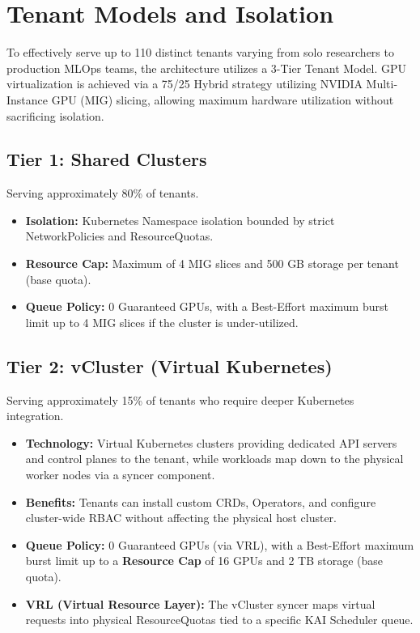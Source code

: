 \chapter{Tenant Models and Isolation}

To effectively serve up to 110 distinct tenants varying from solo researchers to production MLOps teams, the architecture utilizes a 3-Tier Tenant Model. GPU virtualization is achieved via a 75/25 Hybrid strategy utilizing NVIDIA Multi-Instance GPU (MIG) slicing, allowing maximum hardware utilization without sacrificing isolation.

\section{Tier 1: Shared Clusters}
Serving approximately 80\% of tenants.
\begin{itemize}
    \item \textbf{Isolation:} Kubernetes Namespace isolation bounded by strict NetworkPolicies and ResourceQuotas.
    \item \textbf{Resource Cap:} Maximum of 4 MIG slices and 500 GB storage per tenant (base quota).
    \item \textbf{Queue Policy:} 0 Guaranteed GPUs, with a Best-Effort maximum burst limit up to 4 MIG slices if the cluster is under-utilized.
\end{itemize}

\section{Tier 2: vCluster (Virtual Kubernetes)}
Serving approximately 15\% of tenants who require deeper Kubernetes integration.
\begin{itemize}
    \item \textbf{Technology:} Virtual Kubernetes clusters providing dedicated API servers and control planes to the tenant, while workloads map down to the physical worker nodes via a syncer component.
    \item \textbf{Benefits:} Tenants can install custom CRDs, Operators, and configure cluster-wide RBAC without affecting the physical host cluster.
    \item \textbf{Queue Policy:} 0 Guaranteed GPUs (via VRL), with a Best-Effort maximum burst limit up to a \textbf{Resource Cap} of 16 GPUs and 2 TB storage (base quota).
    \item \textbf{VRL (Virtual Resource Layer):} The vCluster syncer maps virtual requests into physical ResourceQuotas tied to a specific KAI Scheduler queue.
\end{itemize}

